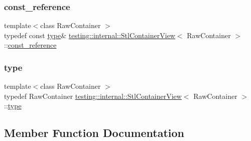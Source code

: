 \subsubsection{\texorpdfstring{const\_reference}{const\_reference}}
{\footnotesize\ttfamily template$<$class Raw\+Container $>$ \\
typedef const \mbox{\hyperlink{classtesting_1_1internal_1_1StlContainerView_a2b2c63a6dcdbfe63fb0ee121ebf463ba}{type}}\& \mbox{\hyperlink{classtesting_1_1internal_1_1StlContainerView}{testing\+::internal\+::\+Stl\+Container\+View}}$<$ Raw\+Container $>$\+::\mbox{\hyperlink{classtesting_1_1internal_1_1StlContainerView_a9cd4f6ed689b3938cdb7b3c4cbf1b36b}{const\+\_\+reference}}}

\mbox{\label{classtesting_1_1internal_1_1StlContainerView_a2b2c63a6dcdbfe63fb0ee121ebf463ba}} 
\subsubsection{\texorpdfstring{type}{type}}
{\footnotesize\ttfamily template$<$class Raw\+Container $>$ \\
typedef Raw\+Container \mbox{\hyperlink{classtesting_1_1internal_1_1StlContainerView}{testing\+::internal\+::\+Stl\+Container\+View}}$<$ Raw\+Container $>$\+::\mbox{\hyperlink{classtesting_1_1internal_1_1StlContainerView_a2b2c63a6dcdbfe63fb0ee121ebf463ba}{type}}}



\subsection{Member Function Documentation}
\mbox{\label{classtesting_1_1internal_1_1StlContainerView_a36eccf53329730f6e55c12002128bf25}} 
